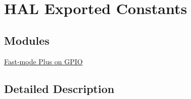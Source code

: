 \hypertarget{group___h_a_l___exported___constants}{}\section{H\+AL Exported Constants}
\label{group___h_a_l___exported___constants}
\subsection*{Modules}
\begin{DoxyCompactItemize}
\item 
\hyperlink{group___s_y_s_c_f_g___fast_mode_plus___g_p_i_o}{Fast-\/mode Plus on G\+P\+IO}
\end{DoxyCompactItemize}


\subsection{Detailed Description}
